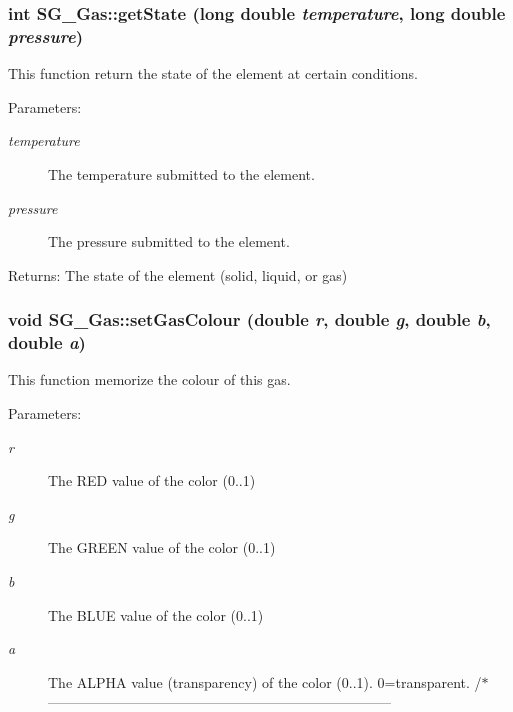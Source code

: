 \subsubsection{\setlength{\rightskip}{0pt plus 5cm}int SG\_\-Gas::get\-State (long double {\em temperature}, long double {\em pressure})}\label{class_s_g___gas_a7}


This function return the state of the element at certain conditions. 

\begin{Desc}
\item[Parameters:]
\begin{description}
\item[{\em temperature}]The temperature submitted to the element. \item[{\em pressure}]The pressure submitted to the element. \end{description}
\end{Desc}
\begin{Desc}
\item[Returns:]The state of the element (solid, liquid, or gas) \end{Desc}
\subsubsection{\setlength{\rightskip}{0pt plus 5cm}void SG\_\-Gas::set\-Gas\-Colour (double {\em r}, double {\em g}, double {\em b}, double {\em a})}\label{class_s_g___gas_a23}


This function memorize the colour of this gas. 

\begin{Desc}
\item[Parameters:]
\begin{description}
\item[{\em r}]The RED value of the color (0..1) \item[{\em g}]The GREEN value of the color (0..1) \item[{\em b}]The BLUE value of the color (0..1) \item[{\em a}]The ALPHA value (transparency) of the color (0..1). 0=transparent. /$\ast$-------------------------------------------------------------------------- \end{description}
\end{Desc}
